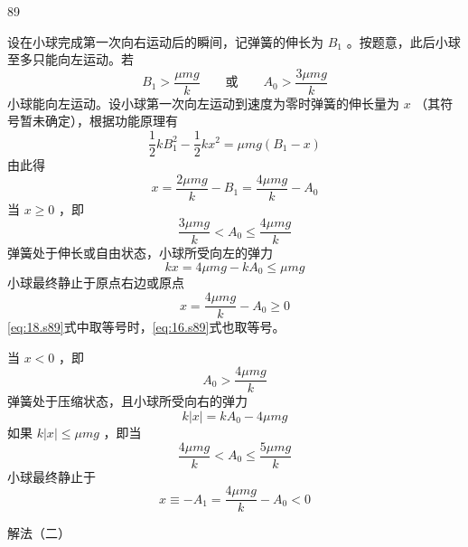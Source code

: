 \begin{solution}{89}
\begin{subsolution}
设在小球完成第一次向右运动后的瞬间，记弹簧的伸长为 $B_{1}$ 。按题意，此后小球至多只能向左运动。若
\begin{equation}
B _ {1} > \frac {\mu m g}{k} \qquad \text {或} \qquad A _ {0} > \frac {3 \mu m g}{k}
\label{eq:13.s89}
\end{equation}
小球能向左运动。设小球第一次向左运动到速度为零时弹簧的伸长量为 $x$ （其符号暂未确定），根据功能原理有
\begin{equation}
\frac {1}{2} k B _ {1} ^ {2} - \frac {1}{2} k x ^ {2} = \mu m g (B _ {1} - x)
\label{eq:14.s89}
\end{equation}
由此得
\begin{equation}
x = \frac {2 \mu m g}{k} - B _ {1} = \frac {4 \mu m g}{k} - A _ {0}
\label{eq:15.s89}
\end{equation}
当 $x \geq 0$ ，即
\begin{equation}
\frac {3 \mu m g}{k} <   A _ {0} \leq \frac {4 \mu m g}{k}
\label{eq:16.s89}
\end{equation}
弹簧处于伸长或自由状态，小球所受向左的弹力
\begin{equation}
k x = 4 \mu m g - k A _ {0} \leq \mu m g
\label{eq:17.s89}
\end{equation}
小球最终静止于原点右边或原点
\begin{equation}
x = \frac {4 \mu m g}{k} - A _ {0} \geq 0
\label{eq:18.s89}
\end{equation}
\eqref{eq:18.s89}式中取等号时，\eqref{eq:16.s89}式也取等号。

当 $x < 0$ ，即
\begin{equation}
A _ {0} > \frac {4 \mu m g}{k}
\label{eq:19.s89}
\end{equation}
弹簧处于压缩状态，且小球所受向右的弹力
\begin{equation}
k | x | = k A _ {0} - 4 \mu m g
\label{eq:20.s89}
\end{equation}
如果 $k|x| \leq \mu mg$ ，即当
\begin{equation}
\frac {4 \mu m g}{k} <   A _ {0} \leq \frac {5 \mu m g}{k}
\label{eq:21.s89}
\end{equation}
小球最终静止于
\begin{equation}
x \equiv - A _ {1} = \frac {4 \mu m g}{k} - A _ {0} <   0
\label{eq:22.s89}
\end{equation}

解法（二）


\end{subsolution}
\end{solution}
